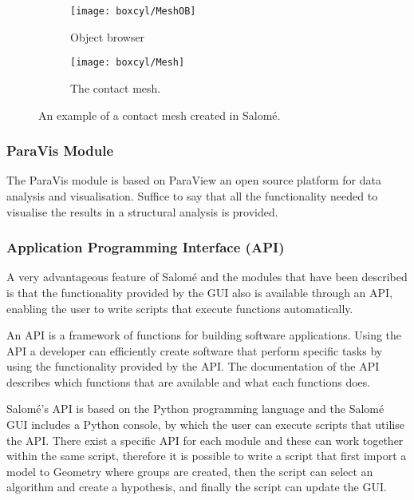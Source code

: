 \begin{figure}[t]
	\begin{subfigure}{.35\textwidth}
		\begin{center}
			\texttt{[image: boxcyl/MeshOB]}
		\end{center}
		\caption{Object browser}
		\label{subfig:boxcylmeshob}
	\end{subfigure}
	\begin{subfigure}{.7\textwidth}
		\begin{center}
			\texttt{[image: boxcyl/Mesh]}
		\end{center}
		\caption{The contact mesh.}
		\label{subfig:boxcylmesh}
	\end{subfigure}
	\caption{An example of a contact mesh created in Salomé.}
	\label{fig:boxcylmesh}
\end{figure}


\subsubsection{ParaVis Module} %
\label{ssub:paravis_module}
The ParaVis module is based on ParaView an open source platform for data analysis and visualisation. Suffice to say that all the functionality needed to visualise the results in a structural analysis is provided.

\subsubsection{Application Programming Interface (API)} %
\label{ssub:application_programming_interface_}
A very advantageous feature of Salomé and the modules that have been described is that the functionality provided by the GUI also is available through an API, enabling the user to write scripts that execute functions automatically.

An API is a framework of functions for building software applications. Using the API a developer can efficiently create software that perform specific tasks by using the functionality provided by the API. The documentation of the API describes which functions that are available and what each functions does.

Salomé's API is based on the Python programming language and the Salomé GUI includes a Python console, by which the user can execute scripts that utilise the API. There exist a specific API for each module and these can work together within the same script, therefore it is possible to write a script that first import a model to Geometry where groups are created, then the script can select an algorithm and create a hypothesis, and finally the script can update the GUI.

